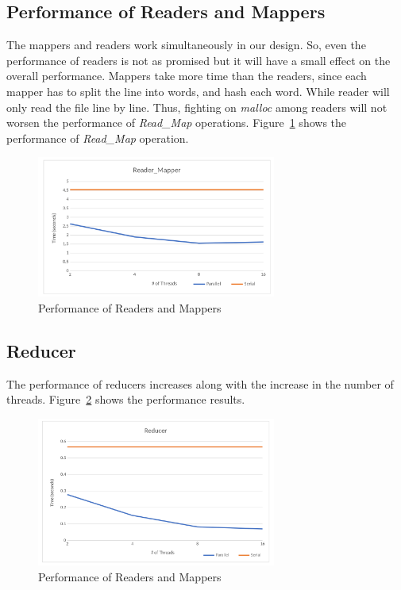 \documentclass[12pt]{article}
\begin{document}
\subsection{Performance of Readers and Mappers}
The mappers and readers work simultaneously in our design. So, even the performance of readers is not as promised but it will have a small effect on the overall performance. Mappers take more time than the readers, since each mapper has to split the line into words, and hash each word. While reader will only read the file line by line.  Thus, fighting on {\em malloc } among readers will not worsen the performance of {\em Read\_Map} operations. Figure~\ref{fig:readmap} shows the performance of {\em Read\_Map} operation.
\begin{figure}[H]
\centering
\includegraphics[width=0.7\textwidth]{fig/reader_mapper.png}
\caption{Performance of Readers and Mappers \label{fig:readmap}}
\end{figure}

\subsection{Reducer}
The performance of reducers increases along with the increase in the number of threads. Figure~\ref{fig:reducer} shows the performance results.
\begin{figure}[H]
\centering
\includegraphics[width=0.7\textwidth]{fig/reducer.png}
\caption{Performance of Readers and Mappers \label{fig:reducer}}
\end{figure}
\end{document}
